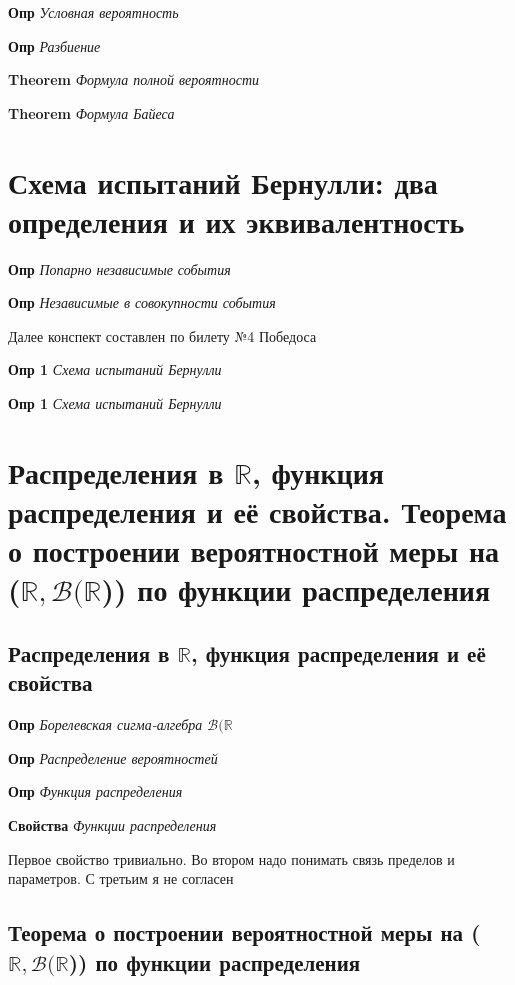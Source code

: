 \documentclass[a4paper, 14pt]{article}
\begin{document}
    \textbf{Опр} \textit{Условная вероятность}
    
    \textbf{Опр} \textit{Разбиение}

    \textbf{Theorem} \textit{Формула полной вероятности}
    
    \textbf{Theorem} \textit{Формула Байеса}
    
    \section{Схема испытаний Бернулли: два определения и их эквивалентность}
    
    \textbf{Опр} \textit{Попарно независимые события}
    
    \textbf{Опр} \textit{Независимые в совокупности события}
    
    Далее конспект составлен по билету №4 Победоса
    
    \textbf{Опр 1} \textit{Схема испытаний Бернулли}
    
    \textbf{Опр 1} \textit{Схема испытаний Бернулли}
    
    \section{Распределения в $\mathbb{R}$, функция распределения и её свойства.
    Теорема о построении вероятностной меры на ($\mathbb{R}, \mathcal{B}(\mathbb{R}$)) по функции распределения}
    
    \subsection{Распределения в $\mathbb{R}$, функция распределения и её свойства}
    
    \textbf{Опр} \textit{Борелевская сигма-алгебра $\mathcal{B}(\mathbb{R}$}
    
    \textbf{Опр} \textit{Распределение вероятностей}
    
    \textbf{Опр} \textit{Функция распределения}
    
    \textbf{Свойства} \textit{Функции распределения}
    
    Первое свойство тривиально.
    Во втором надо понимать связь пределов и параметров.
    С третьим я не согласен
    
    \subsection{Теорема о построении вероятностной меры на ($\mathbb{R}, \mathcal{B}(\mathbb{R}$)) по функции
    распределения}
    
\end{document}
